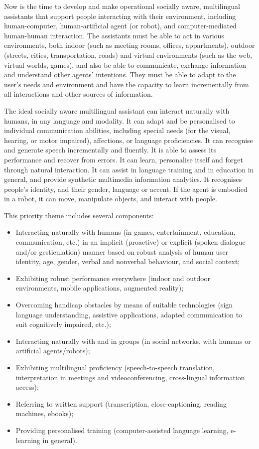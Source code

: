 \documentclass[10pt, plain]{../../metanetpaper}
\begin{document}
\begin{multicols}{2}
Now is the time to develop and make operational socially aware, multilingual assistants that support people interacting with their environment, including human-computer, human-artificial agent (or robot), and computer-mediated human-human interaction. The assistants must be able to act in various environments, both indoor (such as meeting rooms, offices, appartments), outdoor (streets, cities, transportation, roads) and virtual environments (such as the web, virtual worlds, games), and also be able to communicate, exchange information and understand other agents’ intentions. They must be able to adapt to the user’s needs and environment and have the capacity to learn incrementally from all interactions and other sources of information.
 
The ideal socially aware multilingual assistant can interact naturally with humans, in any language and modality. It can adapt and be personalised to individual communication abilities, including special needs (for the visual, hearing, or motor impaired), affections, or language proficiencies. It can recognise and generate speech incrementally and fluently. It is able to assess its performance and recover from errors. It can learn, personalise itself and forget through natural interaction. It can assist in language training and in education in general, and provide synthetic multimedia information analytics. It recognises people’s identity, and their gender, language or accent. If the agent is embodied in a robot, it can move, manipulate objects, and interact with people.

This priority theme includes several components:

\begin{itemize}
\item Interacting naturally with humans (in games, entertainment, education, communication, etc.) in an implicit (proactive) or explicit (spoken dialogue and/or gesticulation) manner based on robust analysis of human user identity, age, gender, verbal and nonverbal behaviour, and social context;
\item Exhibiting robust performance everywhere (indoor and outdoor environments, mobile applications, augmented reality);
\item Overcoming handicap obstacles by means of suitable technologies (sign language understanding, assistive applications, adapted communication to suit cognitively impaired, etc.);
\item Interacting naturally with and in groups (in social networks, with humans or artificial agents/robots);
\item Exhibiting multilingual proficiency (speech-to-speech translation, interpretation in meetings and videoconferencing, cross-lingual information access);
\item Referring to written support (transcription, close-captioning, reading machines, ebooks);
\item Providing personalised training (computer-assisted language learning, e-learning in general).
\end{itemize}


\end{multicols}
\end{document}

